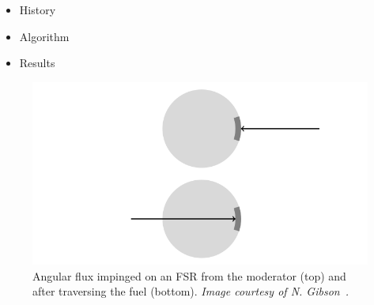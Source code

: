 \begin{itemize}
\item History
\item Algorithm
\item Results
\end{itemize}


\begin{figure}[h]
  \centering
  \includegraphics[width=\linewidth]{figures/incoming-outgoing}
  \caption{Angular flux impinged on an FSR from the moderator (top) and after traversing the fuel (bottom). \textit{Image courtesy of N. Gibson~\cite{gibson2016thesis}.}}
\label{fig:incoming-outgoing}
\end{figure}


